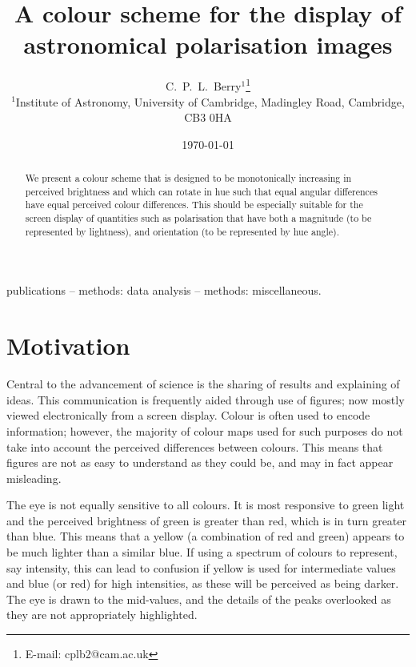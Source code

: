 \documentclass[useAMS,usedcolumn,usegraphicx,usenatbib]{mn2e}
\title[A colour scheme for the display of astronomical polarisation images]{A colour scheme for the display of astronomical polarisation images}
\author[C.\ P.\ L.\ Berry]{C.\ P.\ L.\ Berry$^{1}$\thanks{E-mail: cplb2@cam.ac.uk}\\
$^{1}$Institute of Astronomy, University of Cambridge, Madingley Road, Cambridge, CB3 0HA}
\begin{document}
\date{\today}

\pagerange{\pageref{firstpage}--\pageref{lastpage}} 

\maketitle

\label{firstpage}

\begin{abstract}
We present a colour scheme that is designed to be monotonically increasing in perceived brightness and which can rotate in hue such that equal angular differences have equal perceived colour differences. This should be especially suitable for the screen display of quantities such as polarisation that have both a magnitude (to be represented by lightness), and orientation (to be represented by hue angle).
\end{abstract}

\begin{keywords}
publications -- methods: data analysis -- methods: miscellaneous.
\end{keywords}

\section{Motivation}\label{sec:Intro}

Central to the advancement of science is the sharing of results and explaining of ideas. This communication is frequently aided through use of figures; now mostly viewed electronically from a screen display. Colour is often used to encode information; however, the majority of colour maps used for such purposes do not take into account the perceived differences between colours. This means that figures are not as easy to understand as they could be, and may in fact appear misleading.

The eye is not equally sensitive to all colours. It is most responsive to green light and the perceived brightness of green is greater than red, which is in turn greater than blue. This means that a yellow (a combination of red and green) appears to be much lighter than a similar blue. If using a spectrum of colours to represent, say intensity, this can lead to confusion if yellow is used for intermediate values and blue (or red) for high intensities, as these will be perceived as being darker. The eye is drawn to the mid-values, and the details of the peaks overlooked as they are not appropriately highlighted.
\end{document}
